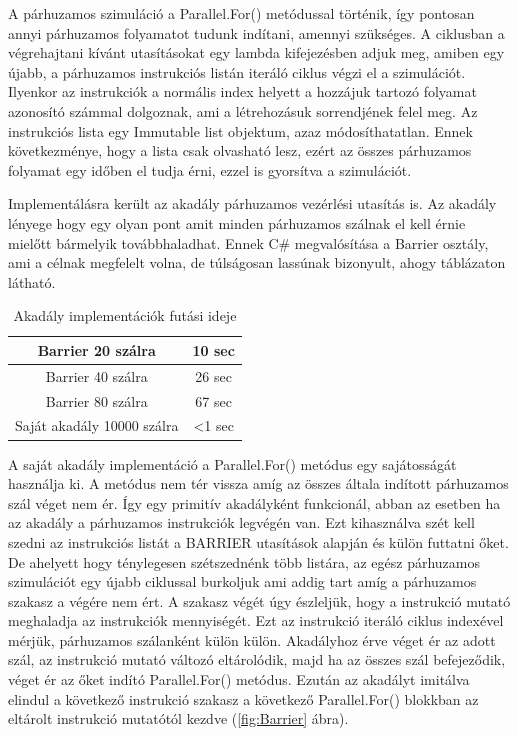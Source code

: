 A párhuzamos szimuláció a Parallel.For() \cite{pfor} metódussal történik, így pontosan annyi párhuzamos folyamatot tudunk indítani, amennyi szükséges. A ciklusban a végrehajtani kívánt utasításokat egy lambda kifejezésben adjuk meg, amiben egy újabb, a párhuzamos instrukciós listán iteráló ciklus végzi el a szimulációt. Ilyenkor az instrukciók a normális index helyett a hozzájuk tartozó folyamat azonosító számmal dolgoznak, ami a létrehozásuk sorrendjének felel meg. Az instrukciós lista egy Immutable list objektum, azaz módosíthatatlan. Ennek következménye, hogy a lista csak olvasható lesz, ezért az összes párhuzamos folyamat egy időben el tudja érni, ezzel is gyorsítva a szimulációt.

Implementálásra került az akadály párhuzamos vezérlési utasítás is. Az akadály lényege hogy egy olyan pont amit minden párhuzamos szálnak el kell érnie mielőtt bármelyik továbbhaladhat. Ennek C\# megvalósítása a Barrier osztály, ami a célnak megfelelt volna, de túlságosan lassúnak bizonyult, ahogy  táblázaton látható.



\begin{table}[h]
\centering
\caption{Akadály implementációk futási ideje}
\label{tab:barrier}
\begin{tabular}{|c|c|}
\hline
Barrier 20 szálra & 10 sec  \\
\hline
Barrier 40 szálra & 26 sec \\
\hline
Barrier 80 szálra & 67 sec \\
\hline 
Saját akadály 10000 szálra & <1 sec \\
\hline
\end{tabular}
\end{table}

A saját akadály implementáció a Parallel.For() metódus egy sajátosságát használja ki. A metódus nem tér vissza amíg az összes általa indított párhuzamos szál véget nem ér. Így egy primitív akadályként funkcionál, abban az esetben ha az akadály a párhuzamos instrukciók legvégén van. Ezt kihasználva szét kell szedni az instrukciós listát a BARRIER utasítások alapján és külön futtatni őket. De ahelyett hogy ténylegesen szétszednénk több listára, az egész párhuzamos szimulációt egy újabb ciklussal burkoljuk ami addig tart amíg a párhuzamos szakasz a végére nem ért. A szakasz végét úgy észleljük, hogy a instrukció mutató meghaladja az instrukciók mennyiségét. Ezt az instrukció iteráló ciklus indexével mérjük, párhuzamos szálanként külön külön. Akadályhoz érve véget ér az adott szál, az instrukció mutató változó eltárolódik, majd ha az összes szál befejeződik, véget ér az őket indító Parallel.For() metódus. Ezután az akadályt imitálva elindul a következő instrukció szakasz a következő Parallel.For() blokkban az eltárolt instrukció mutatótól kezdve (\ref{fig:Barrier} ábra). 

